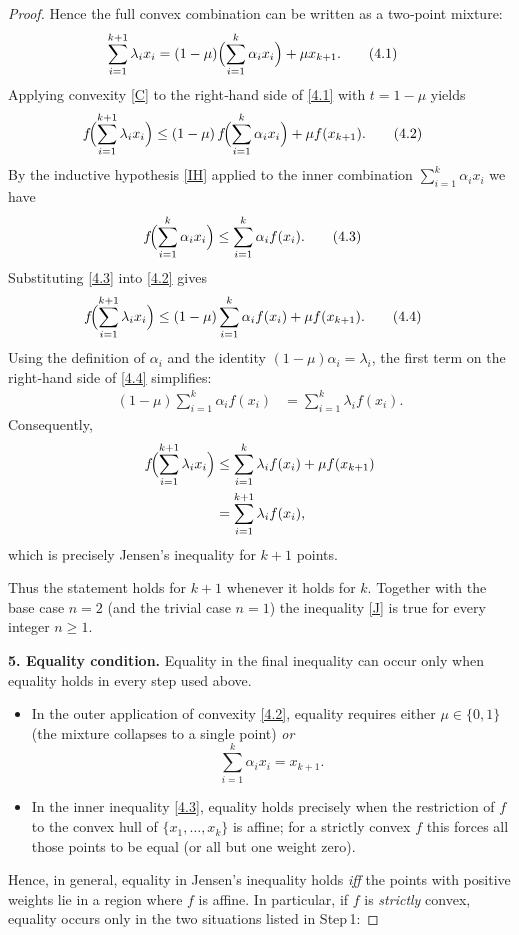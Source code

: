 \begin{proof}
Hence the full convex combination can be written as a two‑point mixture:
\begin{align*}
\sum_{i=1}^{k+1}\lambda_{i}x_{i}
   &=(1-\mu)\Bigl(\sum_{i=1}^{k}\alpha_{i}x_{i}\Bigr)+\mu x_{k+1}. \tag{4.1}
\end{align*}
Applying convexity \eqref{C} to the right‑hand side of \eqref{4.1} with
$t=1-\mu$ yields
\begin{align*}
f\!\Bigl(\sum_{i=1}^{k+1}\lambda_{i}x_{i}\Bigr)
   &\le (1-\mu)\,
      f\!\Bigl(\sum_{i=1}^{k}\alpha_{i}x_{i}\Bigr)+\mu f(x_{k+1}). \tag{4.2}
\end{align*}
By the inductive hypothesis \eqref{IH} applied to the inner combination
$\sum_{i=1}^{k}\alpha_{i}x_{i}$ we have
\begin{align*}
f\!\Bigl(\sum_{i=1}^{k}\alpha_{i}x_{i}\Bigr)
   &\le \sum_{i=1}^{k}\alpha_{i}f(x_{i}). \tag{4.3}
\end{align*}
Substituting \eqref{4.3} into \eqref{4.2} gives
\begin{align*}
f\!\Bigl(\sum_{i=1}^{k+1}\lambda_{i}x_{i}\Bigr)
   &\le (1-\mu)\sum_{i=1}^{k}\alpha_{i}f(x_{i})+\mu f(x_{k+1}). \tag{4.4}
\end{align*}
Using the definition of $\alpha_{i}$ and the identity $(1-\mu)\alpha_{i}=\lambda_{i}$,
the first term on the right‑hand side of \eqref{4.4} simplifies:
\begin{align*}
(1-\mu)\sum_{i=1}^{k}\alpha_{i}f(x_{i})
   &=\sum_{i=1}^{k}\lambda_{i}f(x_{i}). \tag{4.5}
\end{align*}
Consequently,
\begin{align*}
f\!\Bigl(\sum_{i=1}^{k+1}\lambda_{i}x_{i}\Bigr)
   &\le \sum_{i=1}^{k}\lambda_{i}f(x_{i})+\mu f(x_{k+1})\\
   &=\sum_{i=1}^{k+1}\lambda_{i}f(x_{i}),
\end{align*}
which is precisely Jensen’s inequality for $k+1$ points.

Thus the statement holds for $k+1$ whenever it holds for $k$. Together
with the base case $n=2$ (and the trivial case $n=1$) the inequality
\eqref{J} is true for every integer $n\ge1$.

\medskip
\textbf{5. Equality condition.}  
Equality in the final inequality can occur only when equality holds in
every step used above.

\begin{itemize}
\item In the outer application of convexity \eqref{4.2}, equality requires
either $\mu\in\{0,1\}$ (the mixture collapses to a single point) \emph{or}
\[
\sum_{i=1}^{k}\alpha_{i}x_{i}=x_{k+1}.
\]
\item In the inner inequality \eqref{4.3}, equality holds precisely when
the restriction of $f$ to the convex hull of $\{x_{1},\dots,x_{k}\}$ is
affine; for a strictly convex $f$ this forces all those points to be
equal (or all but one weight zero).
\end{itemize}
Hence, in general, equality in Jensen’s inequality holds \emph{iff}
the points with positive weights lie in a region where $f$ is affine.
In particular, if $f$ is \emph{strictly} convex, equality occurs only in
the two situations listed in Step 1:


\end{proof}
